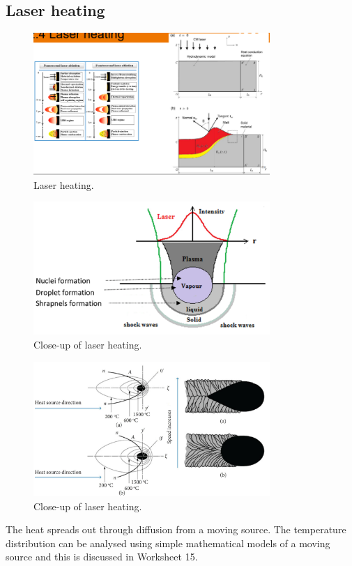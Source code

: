 \subsection{Laser heating}
\begin{figure}[H]
    \centering
    \includegraphics[width = 0.8\textwidth]{img/figure45.png}
    \caption{Laser heating.}
\end{figure}
\begin{figure}[H]
    \centering
    \includegraphics[width = 0.8\textwidth]{img/figure46.png}
    \caption{Close-up of laser heating.}
\end{figure}
\begin{figure}[H]
    \centering
    \includegraphics[width = 0.8\textwidth]{img/figure47.png}
    \caption{Close-up of laser heating.}
\end{figure}
The heat spreads out through diffusion from a moving source. The temperature distribution can be analysed using simple mathematical models of a moving source and this is discussed in Worksheet 15.

